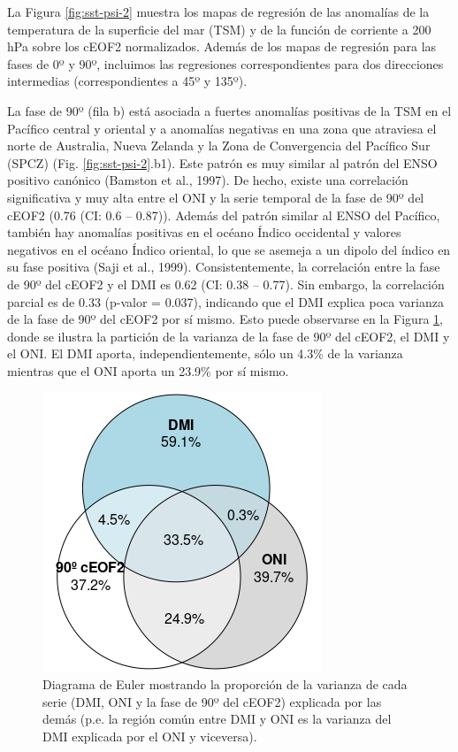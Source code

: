 \documentclass[12pt,oneside]{reedthesis}
\begin{document}
La Figura \ref{fig:sst-psi-2} muestra los mapas de regresión de las anomalías de la temperatura de la superficie del mar (TSM) y de la función de corriente a 200 hPa sobre los cEOF2 normalizados.
Además de los mapas de regresión para las fases de 0º y 90º, incluimos las regresiones correspondientes para dos direcciones intermedias (correspondientes a 45º y 135º).

La fase de 90º (fila b) está asociada a fuertes anomalías positivas de la TSM en el Pacífico central y oriental y a anomalías negativas en una zona que atraviesa el norte de Australia, Nueva Zelanda y la Zona de Convergencia del Pacífico Sur (SPCZ) (Fig. \ref{fig:sst-psi-2}.b1).
Este patrón es muy similar al patrón del ENSO positivo canónico (Bamston et al., 1997).
De hecho, existe una correlación significativa y muy alta entre el ONI y la serie temporal de la fase de 90º del cEOF2 (0.76 (CI: 0.6 -- 0.87)).
Además del patrón similar al ENSO del Pacífico, también hay anomalías positivas en el océano Índico occidental y valores negativos en el océano Índico oriental, lo que se asemeja a un dipolo del índico en su fase positiva (Saji et al., 1999).
Consistentemente, la correlación entre la fase de 90º del cEOF2 y el DMI es 0.62 (CI: 0.38 -- 0.77).
Sin embargo, la correlación parcial es de 0.33 (p-valor = 0.037), indicando que el DMI explica poca varianza de la fase de 90º del cEOF2 por sí mismo.
Esto puede observarse en la Figura \ref{fig:euler}, donde se ilustra la partición de la varianza de la fase de 90º del cEOF2, el DMI y el ONI.
El DMI aporta, independientemente, sólo un 4.3\% de la varianza mientras que el ONI aporta un 23.9\% por sí mismo.

\begin{figure}
\includegraphics{figures/20-ceofs/euler-1} \caption{Diagrama de Euler mostrando la proporción de la varianza de cada serie (DMI, ONI y la fase de 90º del cEOF2) explicada por las demás (p.e. la región común entre DMI y ONI es la varianza del DMI explicada por el ONI y viceversa).}\label{fig:euler}
\end{figure}
\end{document}
